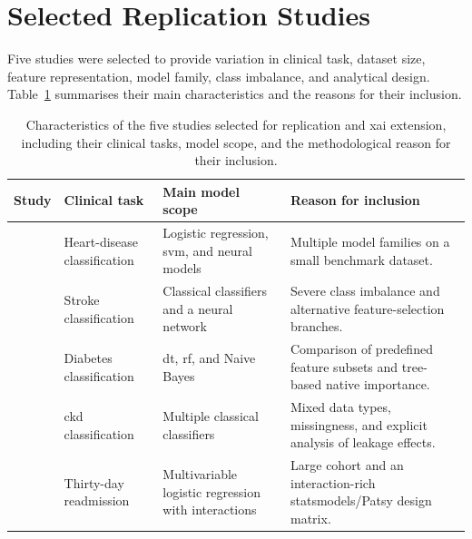 \section{Selected Replication Studies}

Five studies were selected to provide variation in clinical task, dataset size, feature representation, model family, class imbalance, and analytical design. Table~\ref{tab:selected_replication_studies} summarises their main characteristics and the reasons for their inclusion.

\begin{table}[H]
    \centering
    \small
    \caption{Characteristics of the five studies selected for replication and \gls{xai} extension, including their clinical tasks, model scope, and the methodological reason for their inclusion.}
    \label{tab:selected_replication_studies}
    \setlength{\tabcolsep}{4pt}
    \renewcommand{\arraystretch}{1.2}
    \begin{tabularx}{\textwidth}{@{}>{\RaggedRight\arraybackslash}p{1.8cm}>{\RaggedRight\arraybackslash}p{2.5cm}>{\RaggedRight\arraybackslash}p{3.0cm}>{\RaggedRight\arraybackslash}X@{}}
        \toprule
        \textbf{Study} & \textbf{Clinical task} & \textbf{Main model scope} & \textbf{Reason for inclusion} \\
        \midrule
        \citep{khanna_comparative_2015} & Heart-disease classification & Logistic regression, \gls{svm}, and neural models & Multiple model families on a small benchmark dataset. \\
        \citep{wu_machine_2024} & Stroke classification & Classical classifiers and a neural network & Severe class imbalance and alternative feature-selection branches. \\
        \citep{chang_pima_2023} & Diabetes classification & \Gls{dt}, \gls{rf}, and Naive Bayes & Comparison of predefined feature subsets and tree-based native importance. \\
        \citep{santhiya_chronic_2024} & \gls{ckd} classification & Multiple classical classifiers & Mixed data types, missingness, and explicit analysis of leakage effects. \\
        \citep{strack_impact_2014} & Thirty-day readmission & Multivariable logistic regression with interactions & Large cohort and an interaction-rich statsmodels/Patsy design matrix. \\
        \bottomrule
    \end{tabularx}
\end{table}

